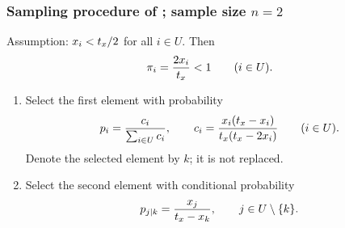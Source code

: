 \documentclass{my_eth_beamer}
\numberwithin{equation}{section}
\begin{document}
\begin{frame}
    \frametitle{\normalsize{Sampling procedure of \citet{brewer_1963}; sample
    size $n=2$}}

    \alert{Assumption:} $x_i<t_x/2$ for all $i\in U$. Then
        \begin{equation*}
            \pi_i=\frac{2x_i}{t_x}<1 \qquad (i\in U).
        \end{equation*}

    \vspace{-0.5em}

    \begin{enumerate}[1)]
    \setlength{\itemsep}{6pt}
        \item Select the \alert{first element} with probability
            \begin{equation*}
                p_i = \frac{c_i}{\sum_{i \in U}c_i}, \qquad
                c_i = \frac{x_i (t_x - x_i)}
                {t_x (t_x - 2 x_i)}
                \qquad (i \in U).
            \end{equation*}
            Denote the selected element by $k$; it is not replaced.
        \item Select the \alert{second element} with conditional probability
            \begin{equation*}
                p_{j \mid k} = \frac{x_j}{t_x - x_k},
                \qquad j\in U\setminus\{k\}.
            \end{equation*}
    \end{enumerate}
\end{frame}
\end{document}
